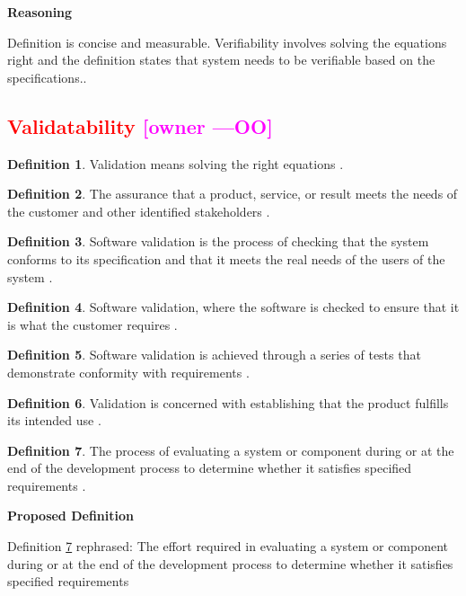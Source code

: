 \documentclass[letterpaper,cleveref]{lipics-v2019}
\newcommand{\authornote}[3]{\textcolor{#1}{[#3 ---#2]}}
\newcommand{\authornote}[3]{}
\newcommand{\oo}[1]{\authornote{magenta}{OO}{#1}} %
\newcommand{\notdone}[1]{\textcolor{red}{#1}}
\theoremstyle{definition}
\newtheorem{defn}{Definition}
\begin{document}
\noindent \textbf{Reasoning} 

Definition is concise and measurable.  Verifiability involves solving the
equations right \citep[p.~23]{Roache1998} and the definition states that system needs to be verifiable based on the specifications..

\subsection{\notdone{Validatability} \oo{owner}}

\begin{defn}
  Validation means solving the right equations \citep[p.~23]{Roache1998}.
\end{defn}


\begin{defn}
  The assurance that a product, service, or result meets the needs of the customer and other identified
  stakeholders \citep{project2017guide}.
\end{defn}
\begin{defn}
	Software validation is the process of checking that the system conforms to its specification and
	that it meets the real needs of the users of the system \citep{sommerville}.
	
\end{defn}
\begin{defn}
	Software validation, where the software is checked to ensure that it is what the
	customer requires \citep{sommerville}.
\end{defn}
\begin{defn}
  Software validation is achieved through a series of tests that demonstrate conformity
  with requirements \citep{pressman2005software}.
\end{defn}

\begin{defn}
	Validation is concerned with establishing that the product fulfills its
	intended use \citep{van2008software}.
\end{defn}

\begin{defn} \label{Defn_Validatability}
  The process of evaluating a system or component during or at the end of the
  development process to determine whether it satisfies specified requirements
  \citep{IEEEStdGlossarySET1990}.
\end{defn}

\noindent \textbf{Proposed Definition}

Definition \ref{Defn_Validatability} rephrased:  The effort required in evaluating
a system or component during or at the end of the development process to determine
whether it satisfies specified requirements
\end{document}
